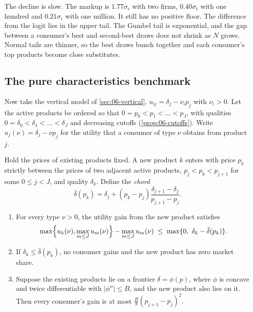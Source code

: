 The decline is slow. The markup is $1.77\sigma_\epsilon$ with two firms, $0.40\sigma_\epsilon$ with one hundred and
$0.21\sigma_\epsilon$ with one million. It still has no positive floor. The difference from the logit lies in the upper
tail. The Gumbel tail is exponential, and the gap between a consumer's best and second-best draws does not shrink as
$N$ grows. Normal tails are thinner, so the best draws bunch together and each consumer's top products become close
substitutes.

\subsection{The pure characteristics benchmark}\label{sec:06-pc-bench}

Now take the vertical model of \cref{sec:06-vertical}, $u_{ij} = \delta_j - \nu_i p_j$ with $\nu_i > 0$. Let the active
products be ordered so that $0 = p_0 < p_1 < \dots < p_J$, with qualities $0 = \delta_0 < \delta_1 < \dots < \delta_J$
and decreasing cutoffs (\cref{prop:06-cutoffs}). Write $u_j(\nu) = \delta_j - \nu p_j$ for the utility that a consumer
of type $\nu$ obtains from product $j$.

\begin{proposition}\label{prop:06-pc-gain}
Hold the prices of existing products fixed. A new product $k$ enters with price $p_k$ strictly between the prices of
two adjacent active products, $p_j < p_k < p_{j+1}$ for some $0 \le j < J$, and quality $\delta_k$. Define the
\emph{chord}
\begin{equation}\label{eq:06-chord}
  \bar\delta(p_k) = \delta_j + (p_k - p_j)\frac{\delta_{j+1} - \delta_j}{p_{j+1} - p_j}.
\end{equation}
\begin{enumerate}[label=(\roman*)]
\item For every type $\nu > 0$, the utility gain from the new product satisfies
\begin{equation}\label{eq:06-pc-gain}
  \max\Bigl\{u_k(\nu), \max_{m \le J} u_m(\nu)\Bigr\} - \max_{m \le J} u_m(\nu) \;\le\; \max\{0,\ \delta_k - \bar\delta(p_k)\}.
\end{equation}
\item If $\delta_k \le \bar\delta(p_k)$, no consumer gains and the new product has zero market share.
\item Suppose the existing products lie on a frontier $\delta = \phi(p)$, where $\phi$ is concave and twice
differentiable with $|\phi''| \le B$, and the new product also lies on it. Then every consumer's gain is at most
$\frac{B}{8}(p_{j+1} - p_j)^2$.
\end{enumerate}
\end{proposition}

